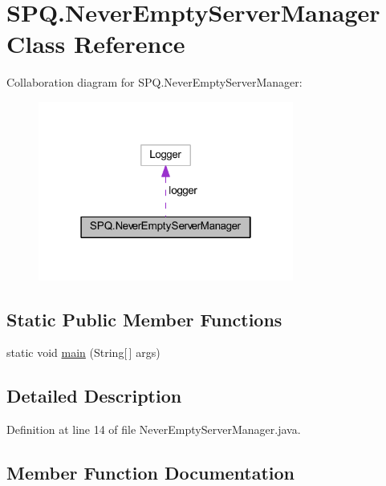 \hypertarget{class_s_p_q_1_1_never_empty_server_manager}{}\section{S\+P\+Q.\+Never\+Empty\+Server\+Manager Class Reference}
\label{class_s_p_q_1_1_never_empty_server_manager}


Collaboration diagram for S\+P\+Q.\+Never\+Empty\+Server\+Manager\+:
\nopagebreak
\begin{figure}[H]
\begin{center}
\leavevmode
\includegraphics[width=238pt]{class_s_p_q_1_1_never_empty_server_manager__coll__graph}
\end{center}
\end{figure}
\subsection*{Static Public Member Functions}
\begin{DoxyCompactItemize}
\item 
static void \mbox{\hyperlink{class_s_p_q_1_1_never_empty_server_manager_a999f5ecf0ed5f60f8661d0064420fdbd}{main}} (String\mbox{[}$\,$\mbox{]} args)
\end{DoxyCompactItemize}


\subsection{Detailed Description}


Definition at line 14 of file Never\+Empty\+Server\+Manager.\+java.



\subsection{Member Function Documentation}
\mbox{\label{class_s_p_q_1_1_never_empty_server_manager_a999f5ecf0ed5f60f8661d0064420fdbd}} 
